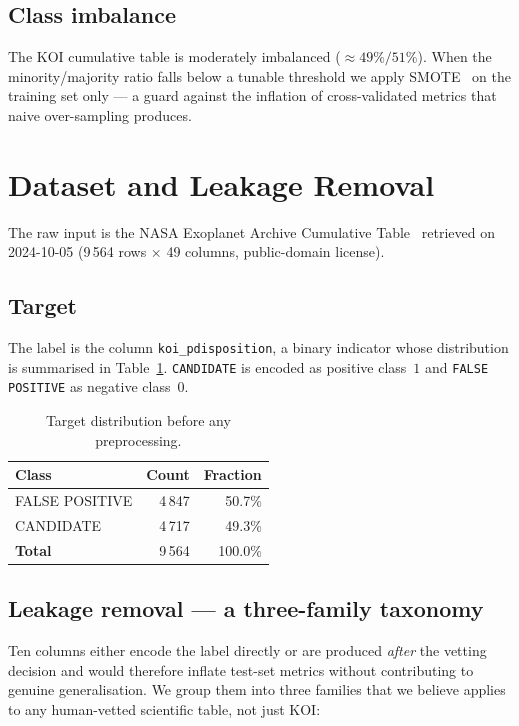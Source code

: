 \documentclass[conference]{IEEEtran}
\begin{document}
\subsection{Class imbalance}
The KOI cumulative table is moderately imbalanced ($\approx
49\%/51\%$). When the minority/majority ratio falls below a tunable
threshold we apply SMOTE~\cite{chawla2002smote} on the training set
only --- a guard against the inflation of cross-validated metrics that
naive over-sampling produces.

\section{Dataset and Leakage Removal}\label{sec:data}

The raw input is the NASA Exoplanet Archive Cumulative
Table~\cite{koitable} retrieved on 2024-10-05 (9\,564 rows
$\times$ 49 columns, public-domain license).

\subsection{Target}
The label is the column \texttt{koi\_pdisposition}, a binary indicator
whose distribution is summarised in Table~\ref{tab:target}.
\texttt{CANDIDATE} is encoded as positive class~$1$ and
\texttt{FALSE POSITIVE} as negative class~$0$.

\begin{table}[!t]
\centering
\caption{Target distribution before any preprocessing.}
\label{tab:target}
\begin{tabular}{lrr}
\toprule
\textbf{Class}        & \textbf{Count} & \textbf{Fraction} \\
\midrule
FALSE POSITIVE        & 4\,847          & 50.7\% \\
CANDIDATE             & 4\,717          & 49.3\% \\
\midrule
\textbf{Total}        & 9\,564          & 100.0\% \\
\bottomrule
\end{tabular}
\end{table}

\subsection{Leakage removal --- a three-family taxonomy}
Ten columns either encode the label directly or are produced
\emph{after} the vetting decision and would therefore inflate
test-set metrics without contributing to genuine generalisation.
We group them into three families that we believe applies to any
human-vetted scientific table, not just KOI:
\end{document}
